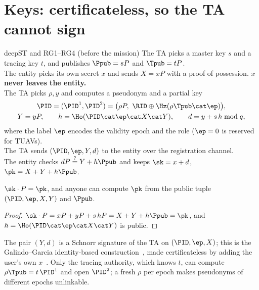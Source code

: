 \section{Keys: certificateless, so the TA cannot sign}
\begin{stepbox}{deep}{ST and RG1--RG4 \;(before the mission)}
 The TA picks a master key $s$ and a tracing key $t$, and publishes $\Ppub=sP$ and $\Tpub=tP$.\\
 The entity picks its own secret $x$ and sends $X=xP$ with a proof of possession. \textbf{$x$ never leaves the entity.}\\
 The TA picks $\rho,y$ and computes a pseudonym and a partial key
\begin{gather*}
\PID=(\PID^1,\PID^2)=\big(\rho P,\ \RID\oplus\Hz(\rho\Tpub\cat\ep)\big),\\
Y=yP,\qquad h=\Ho(\PID\cat\ep\cat X\cat Y),\qquad d=y+s\,h\bmod q ,
\end{gather*}
where the label $\ep$ encodes the validity epoch and the role ($\ep=0$ is reserved for TUAVs).\\
 The TA sends $(\PID,\ep,Y,d)$ to the entity over the registration channel.\\
 The entity checks $dP\overset{?}{=}Y+h\Ppub$ and keeps $\sk=x+d$, \;$\pk=X+Y+h\Ppub$.
\end{stepbox}

\begin{lemma}\label{lem:keycons}
$\sk\cdot P=\pk$, and anyone can compute $\pk$ from the public tuple $(\PID,\ep,X,Y)$ and $\Ppub$.
\end{lemma}
\begin{proof}
$\sk\cdot P=xP+yP+s\,hP=X+Y+h\Ppub=\pk$, and $h=\Ho(\PID\cat\ep\cat X\cat Y)$ is public.
\end{proof}
\noindent The pair $(Y,d)$ is a Schnorr signature of the TA on $(\PID,\ep,X)$; this is the Galindo--Garcia identity-based construction~\cite{gg09}, made
certificateless by adding the user's own $x$~\cite{alriyami}. Only the tracing authority, which knows $t$, can compute $\rho\Tpub=t\,\PID^1$ and open
$\PID^2$; a fresh $\rho$ per epoch makes pseudonyms of different epochs unlinkable.

